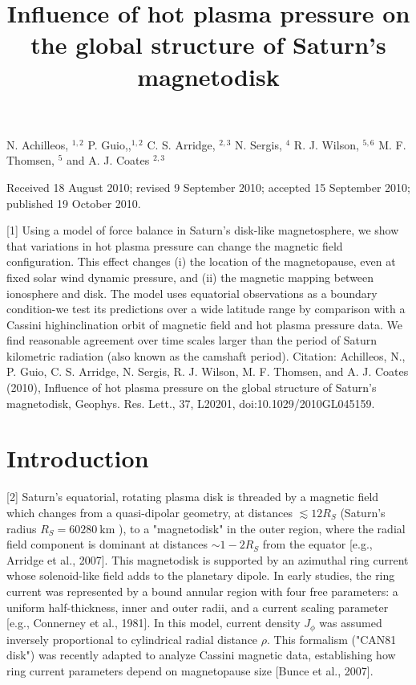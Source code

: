 \documentclass[10pt]{article}
\title{Influence of hot plasma pressure on the global structure of Saturn's magnetodisk }
\author{}
\date{}
\begin{document}
\maketitle
N. Achilleos, ${ }^{1,2}$ P. Guio,,${ }^{1,2}$ C. S. Arridge, ${ }^{2,3}$ N. Sergis, ${ }^{4}$ R. J. Wilson, ${ }^{5,6}$ M. F. Thomsen, ${ }^{5}$ and A. J. Coates ${ }^{2,3}$

Received 18 August 2010; revised 9 September 2010; accepted 15 September 2010; published 19 October 2010.

[1] Using a model of force balance in Saturn's disk-like magnetosphere, we show that variations in hot plasma pressure can change the magnetic field configuration. This effect changes (i) the location of the magnetopause, even at fixed solar wind dynamic pressure, and (ii) the magnetic mapping between ionosphere and disk. The model uses equatorial observations as a boundary condition-we test its predictions over a wide latitude range by comparison with a Cassini highinclination orbit of magnetic field and hot plasma pressure data. We find reasonable agreement over time scales larger than the period of Saturn kilometric radiation (also known as the camshaft period). Citation: Achilleos, N., P. Guio, C. S. Arridge, N. Sergis, R. J. Wilson, M. F. Thomsen, and A. J. Coates (2010), Influence of hot plasma pressure on the global structure of Saturn's magnetodisk, Geophys. Res. Lett., 37, L20201, doi:10.1029/2010GL045159.

\section{Introduction}
[2] Saturn's equatorial, rotating plasma disk is threaded by a magnetic field which changes from a quasi-dipolar geometry, at distances $\lesssim 12 R_{S}$ (Saturn's radius $R_{S}=60280 \mathrm{~km}$ ), to a "magnetodisk" in the outer region, where the radial field component is dominant at distances $\sim 1-2 R_{S}$ from the equator [e.g., Arridge et al., 2007]. This magnetodisk is supported by an azimuthal ring current whose solenoid-like field adds to the planetary dipole. In early studies, the ring current was represented by a bound annular region with four free parameters: a uniform half-thickness, inner and outer radii, and a current scaling parameter [e.g., Connerney et al., 1981]. In this model, current density $J_{\phi}$ was assumed inversely proportional to cylindrical radial distance $\rho$. This formalism ("CAN81 disk") was recently adapted to analyze Cassini magnetic data, establishing how ring current parameters depend on magnetopause size [Bunce et al., 2007].
\end{document}
